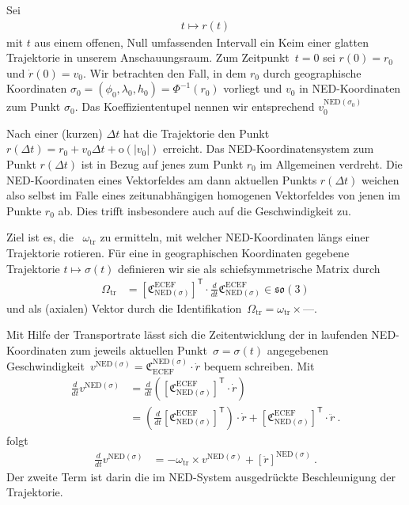 \documentclass[10pt,a4paper]{article}
\newcommand{\mydef}[1]{\textls{#1}}
\newcommand{\nul}{\textrm{---}}
\newcommand{\trans}{^\mathsf{T}}
\begin{document}
Sei
\begin{align}
	t \mapsto r(t)
\end{align}
mit $t$ aus einem offenen, Null umfassenden Intervall ein Keim einer glatten Trajektorie in unserem Anschauungsraum.
Zum Zeitpunkt~$t=0$ sei $r(0)=r_0$ und $\dot{r}(0)=v_0$.
Wir betrachten den Fall, in dem $r_0$ durch geographische Koordinaten $\sigma_0=(\phi_0, \lambda_0, h_0)=\Phi^{-1}(r_0)$ vorliegt und $v_0$ in NED-Koordinaten zum Punkt $\sigma_0$. 
Das Koeffiziententupel nennen wir entsprechend $v_0^{\mathrm{NED}(\sigma_0)}$

Nach einer (kurzen) $\Delta t$ hat die Trajektorie den Punkt $r(\Delta t) = r_0 + v_0\Delta t + \mathrm{o}(|v_0|)$ erreicht.
Das NED-Koordinatensystem zum Punkt $r(\Delta t)$ ist in Bezug auf jenes zum Punkt $r_0$ im Allgemeinen verdreht.
Die NED-Koordinaten eines Vektorfeldes am dann aktuellen Punkts $r(\Delta t)$ weichen also selbst im Falle eines zeitunabhängigen homogenen Vektorfeldes von jenen im Punkte $r_0$ ab.
Dies trifft insbesondere auch auf die Geschwindigkeit zu.

Ziel ist es, die \mydef{Transportrate}~$\omega_{\mathrm{tr}}$ zu ermitteln, mit welcher NED-Koordinaten längs einer Trajektorie rotieren.
Für eine in geographischen Koordinaten gegebene Trajektorie $t \mapsto \sigma(t)$ definieren wir sie als schiefsymmetrische Matrix durch
\begin{align}
\label{eq:omega_tr_def}
	\Omega_{\mathrm{tr}}
	&=
	\left[
	\mathfrak{C}^{\mathrm{ECEF}}_{\mathrm{NED}(\sigma)}
	\right]\trans
	\cdot
	\frac{d}{dt}
	\mathfrak{C}^{\mathrm{ECEF}}_{\mathrm{NED}(\sigma)}
	\in\mathfrak{so}(3)
\end{align}
und als (axialen) Vektor durch die Identifikation~$\Omega_{\mathrm{tr}}=\omega_{\mathrm{tr}}\times\nul$.

Mit Hilfe der Transportrate lässt sich die Zeitentwicklung der in laufenden NED-Koordinaten zum jeweils aktuellen Punkt~$\sigma=\sigma(t)$ angegebenen Geschwindigkeit~$v^{\mathrm{NED}(\sigma)}=\mathfrak{C}_{\mathrm{ECEF}}^{\mathrm{NED}(\sigma)}\cdot \dot{r}$ bequem schreiben.
Mit
\begin{align}
	\frac{d}{dt}
	v^{\mathrm{NED}(\sigma)}
	&=
	\frac{d}{dt}
	\left(
	\left[
		\mathfrak{C}^{\mathrm{ECEF}}_{\mathrm{NED}(\sigma)}
	\right]\trans
	\cdot
	\dot{r}
	\right)
	\nonumber\\
	&=
	\left(
	\frac{d}{dt}
	\left[
		\mathfrak{C}^{\mathrm{ECEF}}_{\mathrm{NED}(\sigma)}
	\right]\trans
	\right)
	\cdot
	\dot{r}
	+
	\left[
		\mathfrak{C}^{\mathrm{ECEF}}_{\mathrm{NED}(\sigma)}
	\right]\trans
	\cdot
	\ddot{r}		
	\ .		
\end{align}
folgt
\begin{align}
	\frac{d}{dt}
	v^{\mathrm{NED}(\sigma)}
	&=
	-\omega_{\mathrm{tr}}
	\times
	v^{\mathrm{NED}(\sigma)}
	+ \left[
		\ddot{r}
	\right]^{\mathrm{NED}(\sigma)}
	\ .	
\end{align}
Der zweite Term ist darin die im NED-System ausgedrückte Beschleunigung der Trajektorie.
\end{document}
